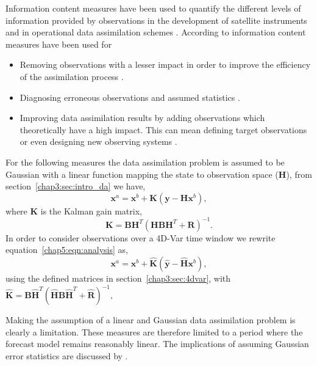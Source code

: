 Information content measures have been used to quantify the different levels of information provided by observations in the development of satellite instruments \citep{stewart2008correlated, engelen2004information} and in operational data assimilation schemes \citep{fisher2003estimation, singh2013practical}. According to \citet{Fowler2013} information content measures have been used for
\begin{itemize}
\item Removing observations with a lesser impact in order to improve the efficiency of the assimilation process \citep{rabier2002channel, singh2013practical, rodgers1998information}.
\item Diagnosing erroneous observations and assumed statistics \citep{desroziers2009posteriori}.
\item Improving data assimilation results by adding observations which theoretically have a high impact. This can mean defining target observations \citep{palmer1998singular} or even designing new observing systems \citep{wahba1985design, eyre1990information}. 
\end{itemize}

For the following measures the data assimilation problem is assumed to be Gaussian with a linear function mapping the state to  observation space (\textbf{H}), from section~\ref{chap3:sec:intro_da} we have,
\begin{equation}
\textbf{x}^{a} = \textbf{x}^{b} + \textbf{K}(\textbf{y} - \textbf{H}\textbf{x}^{b}), \label{chap5:eqn:analysis}
\end{equation}
where $\textbf{K}$ is the Kalman gain matrix,
\begin{equation}
\textbf{K} = \textbf{B}\textbf{H}^{T}(\textbf{H}\textbf{B}\textbf{H}^{T}+\textbf{R})^{-1}.
\end{equation}
In order to consider observations over a 4D-Var time window we rewrite equation~\eqref{chap5:eqn:analysis} as,
\begin{equation}
\textbf{x}^{a} = \textbf{x}^{b} + \hat{\textbf{K}}(\hat{\textbf{y}} - \hat{\textbf{H}}\textbf{x}^{b}),
\end{equation}
using the defined matrices in section~\ref{chap3:sec:4dvar}, with $\hat{\textbf{K}} = \textbf{B}\hat{\textbf{H}}^{T}(\hat{\textbf{H}}\textbf{B}\hat{\textbf{H}}^{T}+\hat{\textbf{R}})^{-1},
$ 

Making the assumption of a linear and Gaussian data assimilation problem is clearly a limitation. These measures are therefore limited to a period where the forecast model remains reasonably linear. The implications of assuming Gaussian error statistics are discussed by \citet{Fowler2013}.

